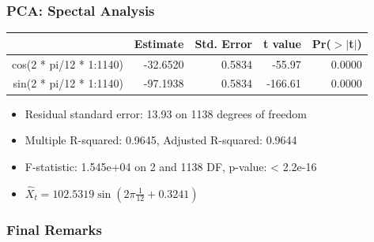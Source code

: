 \documentclass{beamer}
\begin{document}
\begin{frame}
\frametitle{PCA: Spectal Analysis}
\begin{table}[ht]
	\centering
	\begin{tabular}{rrrrr}
		\hline
		& Estimate & Std. Error & t value & Pr($>$$|$t$|$) \\ 
		\hline
		cos(2 * pi/12 * 1:1140) & -32.6520 & 0.5834 & -55.97 & 0.0000 \\ 
		sin(2 * pi/12 * 1:1140) & -97.1938 & 0.5834 & -166.61 & 0.0000 \\ 
		\hline
	\end{tabular}
\end{table}
\begin{itemize}
	\item Residual standard error: 13.93 on 1138 degrees of freedom
	\item Multiple R-squared:  0.9645,	Adjusted R-squared:  0.9644 
	\item F-statistic: 1.545e+04 on 2 and 1138 DF,  p-value: < 2.2e-16
	\item $\hat{X}_t = 102.5319\sin(2\pi\frac{1}{12} + 0.3241)$
\end{itemize}
\end{frame}

\begin{frame}
\frametitle{Final Remarks}
\end{frame}
\end{document}
